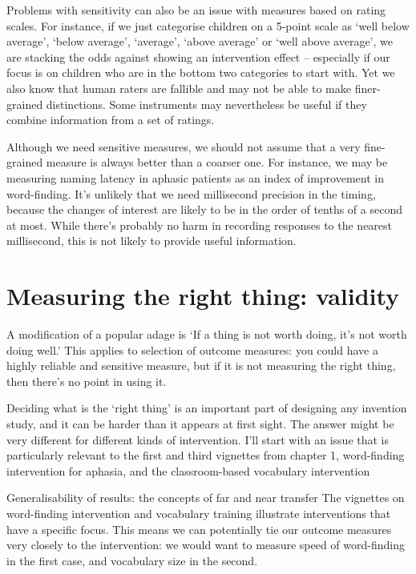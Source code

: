 \documentclass[]{book}
\begin{document}
Problems with sensitivity can also be an issue with measures based on rating scales. For instance, if we just categorise children on a 5-point scale as `well below average', `below average', `average', `above average' or `well above average', we are stacking the odds against showing an intervention effect -- especially if our focus is on children who are in the bottom two categories to start with. Yet we also know that human raters are fallible and may not be able to make finer-grained distinctions. Some instruments may nevertheless be useful if they combine information from a set of ratings.

Although we need sensitive measures, we should not assume that a very fine-grained measure is always better than a coarser one. For instance, we may be measuring naming latency in aphasic patients as an index of improvement in word-finding. It's unlikely that we need millisecond precision in the timing, because the changes of interest are likely to be in the order of tenths of a second at most. While there's probably no harm in recording responses to the nearest millisecond, this is not likely to provide useful information.

\hypertarget{measuring-the-right-thing-validity}{%
\section{Measuring the right thing: validity}\label{measuring-the-right-thing-validity}}

A modification of a popular adage is `If a thing is not worth doing, it's not worth doing well.' This applies to selection of outcome measures: you could have a highly reliable and sensitive measure, but if it is not measuring the right thing, then there's no point in using it.

Deciding what is the `right thing' is an important part of designing any invention study, and it can be harder than it appears at first sight. The answer might be very different for different kinds of intervention. I'll start with an issue that is particularly relevant to the first and third vignettes from chapter 1, word-finding intervention for aphasia, and the classroom-based vocabulary intervention

Generalisability of results: the concepts of far and near transfer
The vignettes on word-finding intervention and vocabulary training illustrate interventions that have a specific focus. This means we can potentially tie our outcome measures very closely to the intervention: we would want to measure speed of word-finding in the first case, and vocabulary size in the second.
\end{document}

